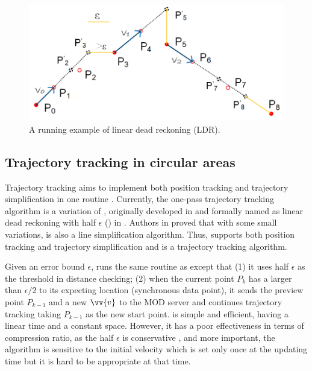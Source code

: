 \begin{figure}[tb!]
	\centering
	\includegraphics[scale=1.0]{figures/Fig-LDR.png}
	\vspace{-1ex}
	\caption{\small A running example of linear dead reckoning (LDR).}
	\vspace{-2ex}
	\label{fig:ldr}
\end{figure}



\subsection{Trajectory tracking in circular areas}
Trajectory tracking aims to implement both position tracking and trajectory simplification in one routine \cite{Lange:Tracking}. Currently, the one-pass trajectory tracking algorithm is a variation of \ldr, originally developed in \cite{Trajcevski:LDRH} and formally named as linear dead reckoning with half $\epsilon$ (\ldrh) in \cite{Lange:Tracking}.
%
Authors in \cite{Trajcevski:LDRH} proved that \ldr with some small variations, is also a line simplification algorithm. Thus, \ldrh supports both position tracking and trajectory simplification and is a trajectory tracking algorithm.

Given an error bound $\epsilon$, \ldrh runs the same routine as \ldr except that (1) it uses half $\epsilon$ as the threshold in distance checking; (2) when the current point $P_k$ has a \sed larger than $\epsilon/2$ to its expecting location (synchronous data point), it sends the preview point $P_{k-1}$ and a new $\vv{v}$ to the MOD server and continues trajectory tracking taking $P_{k-1}$ as the new start point. \ldrh is simple and efficient, having a linear time and a constant space. However, it has a poor effectiveness in terms of compression ratio, as the half $\epsilon$ is conservative \cite{Lange:Tracking}, and more important, the algorithm is sensitive to the initial velocity which is set only once at the updating time but it is hard to be appropriate at that time.

